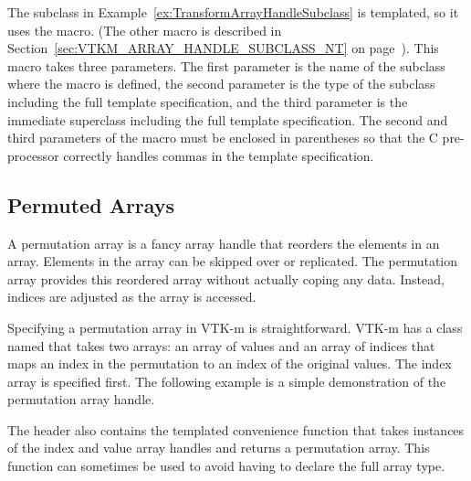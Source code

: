 The  subclass in
Example~\ref{ex:TransformArrayHandleSubclass} is templated, so it uses the
 macro. (The other macro is
described in Section~\ref{sec:VTKM_ARRAY_HANDLE_SUBCLASS_NT} on
page~\pageref{sec:VTKM_ARRAY_HANDLE_SUBCLASS_NT}). This macro takes three
parameters. The first parameter is the name of the subclass where the macro
is defined, the second parameter is the type of the subclass including the
full template specification, and the third parameter is the immediate
superclass including the full template specification. The second and third
parameters of the macro must be enclosed in parentheses so that the C
pre-processor correctly handles commas in the template specification.


\subsection{Permuted Arrays}
\label{sec:PermutedArrays}


A permutation array is a fancy array handle that reorders the elements in
an array. Elements in the array can be skipped over or replicated. The
permutation array provides this reordered array without actually coping any
data. Instead, indices are adjusted as the array is accessed.

Specifying a permutation array in VTK-m is straightforward. VTK-m has a
class named  that takes two arrays: an
array of values and an array of indices that maps an index in the
permutation to an index of the original values. The index array is
specified first. The following example is a simple demonstration of the
permutation array handle.


The  header also contains the
templated convenience function  that
takes instances of the index and value array handles and returns a
permutation array. This function can sometimes be used to avoid having to
declare the full array type.


